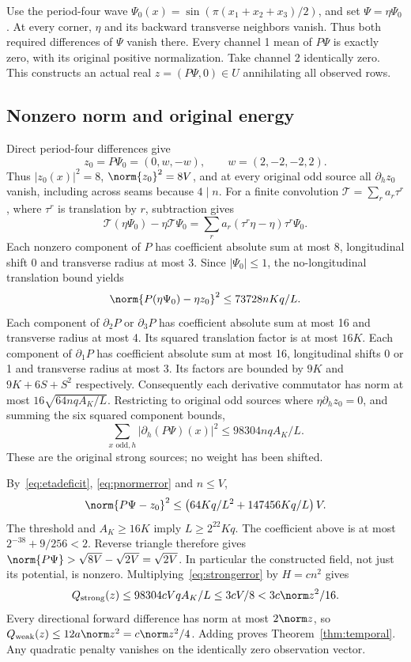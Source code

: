 Use the period-four wave
$\Psi_0(x)=\sin(\pi(x_1+x_2+x_3)/2)$, and set
$\Psi=\eta\Psi_0$. At every corner, $\eta$ and its backward transverse
neighbors vanish. Thus both required differences of $\Psi$ vanish there.
Every channel 1 mean of $P\Psi$ is exactly zero, with its original positive
normalization. Take channel 2 identically zero. This constructs an actual
real $z=(P\Psi,0)\in U$ annihilating all observed rows.

\subsection{Nonzero norm and original energy}
Direct period-four differences give
\[z_0=P\Psi_0=(0,w,-w),\qquad w=(2,-2,-2,2).\]
Thus $|z_0(x)|^2=8$,
$\norm{z_0}^2=8V$, and at every original odd source all $\partial_hz_0$
vanish, including across seams because $4\mid n$.
For a finite convolution $\mathcal T=\sum_r a_r\tau^r$, where $\tau^r$
is translation by $r$, subtraction gives
\[
 \mathcal T(\eta\Psi_0)-\eta\mathcal T\Psi_0
 =\sum_r a_r(\tau^r\eta-\eta)\tau^r\Psi_0.
\]
Each nonzero component of $P$ has coefficient absolute sum at most 8,
longitudinal shift 0 and transverse radius at most 3. Since $|\Psi_0|\leq1$,
the no-longitudinal translation bound yields
\begin{equation}\label{eq:pnormerror}
 \norm{P(\eta\Psi_0)-\eta z_0}^2\leq73728nKq/L.
\end{equation}
Each component of $\partial_2P$ or $\partial_3P$ has coefficient absolute
sum at most 16 and transverse radius at most 4. Its squared translation
factor is at most $16K$. Each component of $\partial_1P$ has coefficient
absolute sum at most 16, longitudinal shifts 0 or 1 and transverse radius
at most 3. Its factors are bounded by $9K$ and $9K+6S+S^2$ respectively.
Consequently each derivative commutator has norm at most
$16\sqrt{64nqA_K/L}$. Restricting to original odd sources where
$\eta\partial_hz_0=0$, and summing the six squared component bounds,
\begin{equation}\label{eq:strongerror}
 \sum_{x\text{ odd},h}|\partial_h(P\Psi)(x)|^2
 \leq98304nqA_K/L.
\end{equation}
These are the original strong sources; no weight has been shifted.

By~\eqref{eq:etadeficit}, \eqref{eq:pnormerror} and $n\leq V$,
\[
 \norm{P\Psi-z_0}^2\leq
 \left(64Kq/L^2+147456Kq/L\right)V.
\]
The threshold and $A_K\geq16K$ imply $L\geq2^{22}Kq$. The coefficient
above is at most $2^{-38}+9/256<2$. Reverse triangle therefore gives
$\norm{P\Psi}>\sqrt{8V}-\sqrt{2V}=\sqrt{2V}$.
In particular the constructed field, not just its potential, is nonzero.
Multiplying~\eqref{eq:strongerror} by $H=cn^2$ gives
\[
 Q_{\rm strong}(z)\leq98304cVqA_K/L
 \leq3cV/8<3c\norm z^2/16.
\]
Every directional forward difference has norm at most $2\norm z$, so
$Q_{\rm weak}(z)\leq12a\norm z^2=c\norm z^2/4$.
Adding proves Theorem~\ref{thm:temporal}. Any quadratic penalty vanishes
on the identically zero observation vector.

